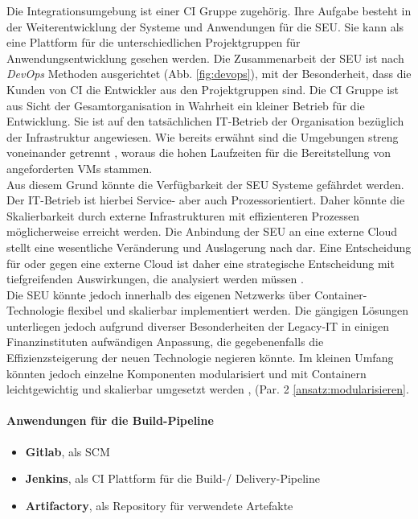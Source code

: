 Die Integrationsumgebung ist einer \ac{CI} Gruppe zugehörig. Ihre Aufgabe besteht in der Weiterentwicklung der Systeme und Anwendungen für die \ac{SEU}. Sie kann als eine Plattform für die unterschiedlichen Projektgruppen für Anwendungsentwicklung gesehen werden.
Die Zusammenarbeit der \ac{SEU} ist nach \emph{DevOps} Methoden ausgerichtet (Abb. \ref{fig:devops}), mit der Besonderheit, dass die Kunden von \ac{CI} die Entwickler aus den Projektgruppen sind. Die \ac{CI} Gruppe ist aus Sicht der Gesamtorganisation in Wahrheit ein kleiner Betrieb für die Entwicklung. Sie ist auf den tatsächlichen IT-Betrieb der Organisation bezüglich der Infrastruktur angewiesen. Wie bereits erwähnt sind die Umgebungen streng voneinander getrennt \cite{MaRisk:2017}, woraus die hohen Laufzeiten für die Bereitstellung von angeforderten \ac{VMs} stammen. 
\medskip
\\
Aus diesem Grund könnte die Verfügbarkeit der \ac{SEU} Systeme gefährdet werden. Der IT-Betrieb ist hierbei Service- aber auch Prozessorientiert. Daher könnte die Skalierbarkeit durch externe Infrastrukturen mit effizienteren Prozessen möglicherweise erreicht werden. Die Anbindung der \ac{SEU} an eine externe Cloud stellt eine wesentliche Veränderung und Auslagerung nach \cite{MaRisk:2017, BAIT:2018} dar. Eine Entscheidung für oder gegen eine externe Cloud ist daher eine strategische Entscheidung mit tiefgreifenden Auswirkungen, die analysiert werden müssen \cite{recht/Bornemann2018, MaRisk:2017, BAIT:2018}.
\medskip
\\
Die \ac{SEU} könnte jedoch innerhalb des eigenen Netzwerks über Container-Technologie flexibel und skalierbar implementiert werden. Die gängigen Lösungen \cite{Pathania2017, Google:GKEJenkins} unterliegen jedoch aufgrund diverser Besonderheiten der Legacy-IT in einigen Finanzinstituten \cite{Brockhoff2006, Bussmann2006} aufwändigen Anpassung, die gegebenenfalls die Effizienzsteigerung der neuen Technologie negieren könnte. Im kleinen Umfang könnten jedoch einzelne Komponenten modularisiert und mit Containern leichtgewichtig und skalierbar umgesetzt werden \cite{Bussmann2006}, (Par. 2 \ref{ansatz:modularisieren}.

\paragraph{Anwendungen für die Build-Pipeline}
\begin{itemize}
    \item \textbf{Gitlab}, als \ac{SCM}
    \item \textbf{Jenkins}, als \ac{CI} Plattform für die Build-/ Delivery-Pipeline
    \item \textbf{Artifactory}, als Repository für verwendete Artefakte
\end{itemize}

